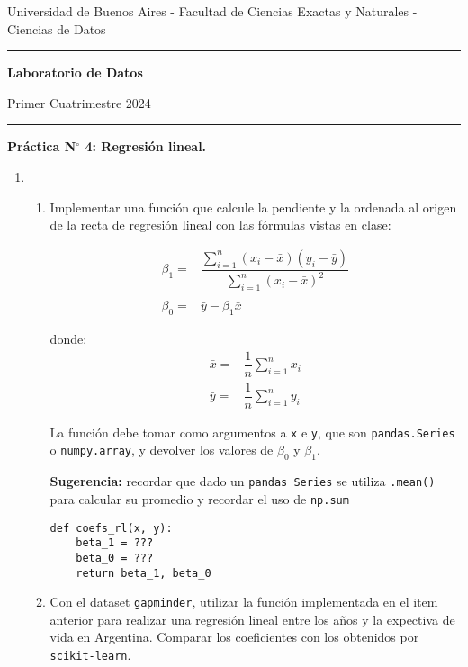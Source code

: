 \documentclass[a4paper,11pt]{article}
\theoremstyle{definition}
\begin{document}
\centerline{{\small Universidad de Buenos Aires - Facultad de Ciencias Exactas y Naturales - Ciencias de Datos}}

\vskip 0.2cm

\hrule

\vskip 0.2cm

 \centerline{{\bf\Large{\sc Laboratorio de Datos}}}

 \vskip 0.2cm

 \centerline{\ttfamily Primer Cuatrimestre 2024}

\vskip 0.2cm

 \hrule

 \bigskip
 \centerline{\bf Práctica N$^\circ$ 4: Regresión lineal.}
 \bigskip



\begin{enumerate}[resume]
\item 
\begin{enumerate}
    \item Implementar una función que calcule la pendiente y la ordenada al origen de la recta de regresión lineal con las fórmulas vistas en clase:

     \[
     \begin{array}{rl}
          {\beta}_1 = & \dfrac{\displaystyle\sum_{i=1}^n(x_i - \bar{x})(y_i - \bar{y})}{\displaystyle\sum_{i=1}^n(x_i - \bar{x})^2}  \\[1em]
          {\beta}_0 = & \bar{y} - \hat{\beta}_1\bar{x}
     \end{array}
     \]

          donde:
     \[
     \begin{array}{rl}
          \bar{x} =& \dfrac{1}{n} \displaystyle\sum_{i=1}^n x_i  \\
          \bar{y} =& \dfrac{1}{n} \displaystyle\sum_{i=1}^n y_i
     \end{array}
     \]


    La función debe tomar como argumentos a \texttt{x} e \texttt{y}, que son \verb|pandas.Series| o \verb|numpy.array|, y devolver los valores de $\beta_0$ y $\beta_1$. 
    
    \textbf{Sugerencia:} recordar que dado un \texttt{pandas Series} se utiliza \texttt{.mean()} para calcular su promedio y recordar el uso de \texttt{np.sum}
    \vspace{0.2cm} 
\begin{lstlisting}
def coefs_rl(x, y):
    beta_1 = ???
    beta_0 = ???
    return beta_1, beta_0
\end{lstlisting}
    \item Con el dataset \texttt{gapminder}, utilizar la función implementada en el item anterior para realizar una regresión lineal entre los años y la expectiva de vida en Argentina. Comparar los coeficientes con los obtenidos por \texttt{scikit-learn}.
    \vspace{0.2cm} 
    

\end{enumerate}
\end{enumerate}
\end{document}
